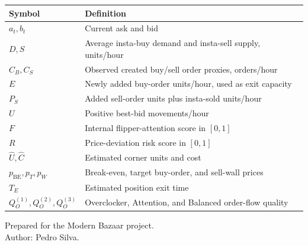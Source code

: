 \documentclass[11pt,a4paper]{article}
\begin{document}
\begin{longtable}{p{}p{}}
\toprule
Symbol & Definition\\
\midrule
\endhead
$a_t,b_t$ & Current ask and bid\\
$D,S$ & Average insta-buy demand and insta-sell supply, units/hour\\
$C_B,C_S$ & Observed created buy/sell order proxies, orders/hour\\
$E$ & Newly added buy-order units/hour, used as exit capacity\\
$P_S$ & Added sell-order units plus insta-sold units/hour\\
$U$ & Positive best-bid movements/hour\\
$F$ & Internal flipper-attention score in $[0,1]$\\
$R$ & Price-deviation risk score in $[0,1]$\\
$\widehat U,\widehat C$ & Estimated corner units and cost\\
$p_{\mathrm{BE}},p_T,p_W$ & Break-even, target buy-order, and sell-wall prices\\
$T_E$ & Estimated position exit time\\
$Q_O^{(1)},Q_O^{(2)},Q_O^{(3)}$ & Overclocker, Attention, and Balanced order-flow quality\\
\bottomrule
\end{longtable}

\vfill
\begin{center}
\small\color{textgray}
Prepared for the Modern Bazaar project.\\
Author: Pedro Silva.
\end{center}
\end{document}
